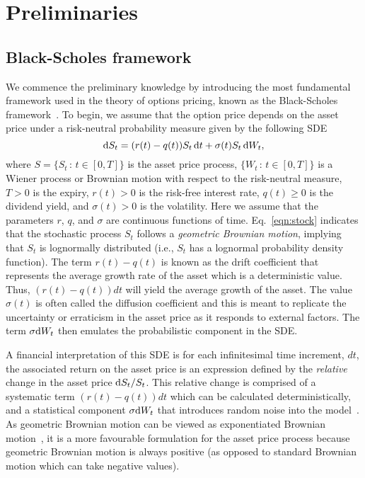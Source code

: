 \chapter{Preliminaries}

\section{Black-Scholes framework}
We commence the preliminary knowledge by introducing the most fundamental framework used in the theory of options pricing, known as the Black-Scholes framework~\cite{Black1973}. To begin, we assume that the option price depends on the asset price under a risk-neutral probability measure given by the following SDE
	\begin{equation}
	\label{eqn:stock}
		\mathrm d S_t = (r(t)-q(t))S_t \, \mathrm d t + \sigma(t)S_t  \, \mathrm d W_t,
	\end{equation}
where $S = \{ S_t \, : \, t \in [0,T] \}$ is the asset price process, $\{ W_t \, : \, t \in [0,T] \}$ is a Wiener process or Brownian motion with respect to the risk-neutral measure, $T > 0$ is the expiry, $r(t) > 0$ is the risk-free interest rate, $q(t) \geq 0$ is the dividend yield, and $\sigma(t) > 0$ is the volatility.
Here we assume that the parameters $r$, $q$, and $\sigma$ are continuous functions of time. Eq.~\eqref{eqn:stock} indicates that the stochastic process $S_t$ follows a
\emph{geometric Brownian motion}, implying that $S_t$ is lognormally distributed (i.e., $S_t$ has a lognormal probability density function). The term $r(t)-q(t)$ is known as the drift coefficient that represents the average growth rate of the asset which is a deterministic value. Thus, $(r(t)-q(t))dt$ will yield the average growth of the asset.
The value $\sigma(t)$ is often called the diffusion coefficient and this is meant to replicate the uncertainty or erraticism in the asset price as it responds to external factors. The term $\sigma \mathrm d W_t$ then emulates the probabilistic component in the SDE.

A financial interpretation of this SDE is for each infinitesimal time increment, $dt$, the associated return on the asset price is an expression defined by the \emph{relative} change in the asset price $\mathrm d S_t/S_t$.
This relative change is comprised of a systematic term $(r(t)-q(t))dt$ which can be calculated deterministically, and a statistical component $\sigma \mathrm d W_t$ that introduces random noise into the model~\cite{Wilmott1995}. As geometric Brownian motion can be viewed as exponentiated Brownian motion~\cite{Glasserman2013}, it is a more favourable formulation for the asset price process
because geometric Brownian motion is always positive (as opposed to standard Brownian motion which can take negative values).

